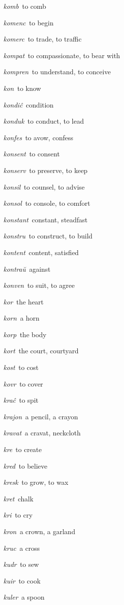 \begin{landscape}
\begin{multicols}{5}
\begin{outdent}{1em}
\emph{komb\,} to comb

\emph{komenc\,} to begin

\emph{komerc\,} to trade, to traffic

\emph{kompat\,} to compassionate, to bear with

\emph{kompren\,} to understand, to conceive

\emph{kon\,} to know

\emph{kondiĉ\,} condition

\emph{konduk\,} to conduct, to lead

\emph{konfes\,} to avow, confess

\emph{konsent\,} to consent

\emph{konserv\,} to preserve, to keep

\emph{konsil\,} to counsel, to advise

\emph{konsol\,} to console, to comfort

\emph{konstant\,} constant, steadfast

\emph{konstru\,} to construct, to build

\emph{kontent\,} content, satisfied

\emph{kontraŭ\,} against

\emph{konven\,} to suit, to agree

\emph{kor\,} the heart

\emph{korn\,} a horn

\emph{korp\,} the body

\emph{kort\,} the court, courtyard

\emph{kost\,} to cost

\emph{kovr\,} to cover

\emph{kraĉ\,} to spit

\emph{krajon\,} a pencil, a crayon

\emph{kravat\,} a cravat, neckcloth

\emph{kre\,} to create

\emph{kred\,} to believe

\emph{kresk\,} to grow, to wax

\emph{kret\,} chalk

\emph{kri\,} to cry

\emph{kron\,} a crown, a garland

\emph{kruc\,} a cross

\emph{kudr\,} to sew

\emph{kuir\,} to cook

\emph{kuler\,} a spoon


\end{outdent}
\end{multicols}
\end{landscape}
